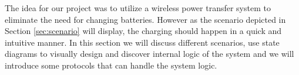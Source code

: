 %
The idea for our project was to utilize a wireless power transfer system to eliminate the need for changing batteries. However as the scenario depicted in Section \ref{sec:scenario} will display, the charging should happen in a quick and intuitive manner. In this section we will discuss different scenarios, use state diagrams to visually design and discover internal logic of the system and we will introduce some protocols that can handle the system logic. 